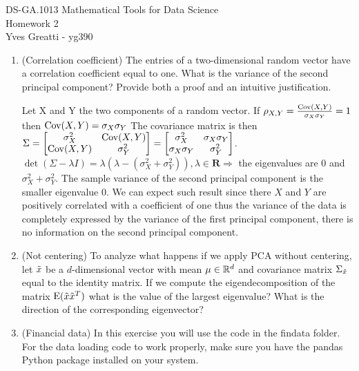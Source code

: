 \documentclass[12pt,twoside]{article}
\begin{document}
\noindent DS-GA.1013 Mathematical Tools for Data Science \\
Homework 2 \\
Yves Greatti - yg390\\

\begin{enumerate}
\item (Correlation coefficient) The entries of a two-dimensional random vector have a correlation coefficient equal to one. What is the variance of the second principal component? Provide both a proof and an intuitive justification. 

Let X and Y the two components of a random vector. If $\rho_{X,Y} = \frac {\mathrm{Cov}(X,Y)}{\sigma_X \sigma_Y} = 1$ then $\mathrm{Cov}(X,Y) = \sigma_X \sigma_Y$
The covariance matrix  is then  $ \Sigma = \begin{bmatrix} \sigma_X^2 & \mathrm{Cov}(X,Y) \\  \mathrm{Cov}(X,Y) & \sigma_Y^2  \end{bmatrix}  = \begin{bmatrix}  \sigma_X^2 &  \sigma_X \sigma_Y \\ \sigma_X \sigma_Y & \sigma_Y^2 \end{bmatrix}$.
$\det(\Sigma -\lambda I) = \lambda (\lambda - (\sigma_X^2 +  \sigma_Y^2)), \lambda \in   \mathbf{R} \Rightarrow $ the eigenvalues are $0$ and $\sigma_X^2 +  \sigma_Y^2$.
The sample variance of the second principal component is the smaller eigenvalue $0$. We can expect such result since there $X$ and $Y$ are positively correlated with a coefficient of one thus the variance of the data is completely expressed by the variance of the first principal component, there is no information on the second principal component.


\newpage
\item (Not centering) To analyze what happens if we apply PCA without centering, let $\tilde{  x }$ be a $d$-dimensional vector with mean $\mu \in \mathbb{R}^{d}$ and covariance matrix $\Sigma_{\tilde{  x }}$ equal to the identity matrix. If we compute the eigendecomposition of the matrix $\mathrm{E}(\tilde{  x } \tilde{  x }^T)$ what is the value of the largest eigenvalue? What is the direction of the corresponding eigenvector? 
  
 \newpage
  
 \item (Financial data) In this exercise you will use the code in the findata folder.
  For the data loading code to work properly, make sure you
  have the pandas Python package installed on your system.


\end{enumerate}
\end{document}
